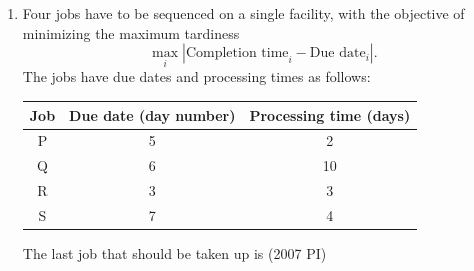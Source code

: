 \begin{enumerate}[label=\thesubsection.\arabic*,ref=\thesubsection.\theenumi]
\hfill (2007 PI)
\begin{enumerate}
\end{enumerate}
\item 
Four jobs have to be sequenced on a single facility, with the objective of minimizing 
the maximum tardiness 
\[
\max_i \left| \text{Completion time}_i - \text{Due date}_i \right|.
\]
The jobs have due dates and processing times as follows:

\begin{center}
\begin{tabular}{|c|c|c|}
\hline
{Job} & {Due date (day number)} & {Processing time (days)} \\
\hline
P & 5 & 2 \\
Q & 6 & 10 \\
R & 3 & 3 \\
S & 7 & 4 \\
\hline
\end{tabular}
\end{center}

The last job that should be taken up is
\hfill (2007 PI)
\begin{enumerate}
\end{enumerate}


\end{enumerate}
